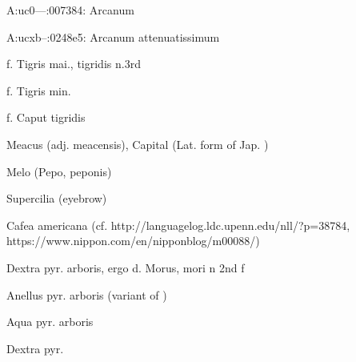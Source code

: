 A:uc0---:007384:{} {\mktsStyleItalic{}Arcanum\/}


A:ucxb--:0248e5:{} {\mktsStyleItalic{}Arcanum attenuatissimum\/}


 {\mktsStyleItalic{}f. Tigris mai.\/}, tigridis  {\mktsStyleItalic{}n.3rd\/}


 {\mktsStyleItalic{}f. Tigris min.\/}


 {\mktsStyleItalic{}f. Caput tigridis\/}


 {\mktsStyleItalic{}Meacus\/} (adj. {\mktsStyleItalic{}meacensis\/}), Capital (Lat. form of Jap. {})


 {\mktsStyleItalic{}Melo\/} ({\mktsStyleItalic{}Pepo\/}, peponis)


 {\mktsStyleItalic{}Supercilia\/} (eyebrow)


 {\mktsStyleItalic{}Cafea americana\/} (cf. http://languagelog.ldc.upenn.edu/nll/?p=38784, https://www.nippon.com/en/nipponblog/m00088/)


 {\mktsStyleItalic{}Dextra pyr. arboris\/}, ergo {\mktsStyleItalic{}d. Morus\/}, mori {\mktsStyleItalic{}n 2nd f\/}


 {\mktsStyleItalic{}Anellus pyr. arboris\/} (variant of {})


 {\mktsStyleItalic{}Aqua pyr. arboris\/}


 {\mktsStyleItalic{}Dextra pyr.\/}



